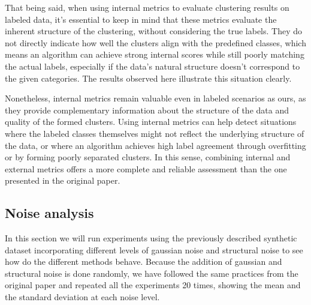 \documentclass[
	10pt,
	parskip=half-,	
	paper=a4,
	english
	]{scrartcl}
\begin{document}
That being said, when using internal metrics to evaluate clustering results on labeled data, it's essential to keep in mind that these metrics evaluate the inherent structure of the clustering, without considering the true labels. They do not directly indicate how well the clusters align with the predefined classes, which means an algorithm can achieve strong internal scores while still poorly matching the actual labels, especially if the data's natural structure doesn't correspond to the given categories. The results observed here illustrate this situation clearly.

Nonetheless, internal metrics remain valuable even in labeled scenarios as ours, as they provide complementary information about the structure of the data and quality of the formed clusters. Using internal metrics can help detect situations where the labeled classes themselves might not reflect the underlying structure of the data, or where an algorithm achieves high label agreement through overfitting or by forming poorly separated clusters. In this sense, combining internal and external metrics offers a more complete and reliable assessment than the one presented in the original paper.

\subsection{Noise analysis}

In this section we will run experiments using the previously described synthetic dataset incorporating different levels of gaussian noise and structural noise to see how do the different methods behave. Because the addition of gaussian and structural noise is done randomly, we have followed the same practices from the original paper and repeated all the experiments 20 times, showing the mean and the standard deviation at each noise level.
\end{document}

